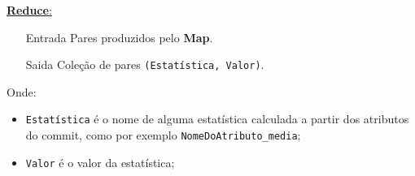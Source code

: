 \documentclass[brazil]{beamer}
\begin{document}
\begin{frame}[fragile]
  \underline{\Large \textbf{Reduce}:}
  
  \vspace{4pt}
  \begin{itemize}
    \item[Entrada] Pares produzidos pelo \textbf{Map}.
    \item[Saida] Coleção de pares \verb$(Estatística, Valor)$.
  \end{itemize}
  
  \pause
  \hspace{10pt}
  Onde:
  \begin{itemize}
    \item \verb$Estatística$ é o nome de alguma estatística calculada a partir dos atributos do commit, 
          como por exemplo \verb$NomeDoAtributo_media$;
    \item \verb$Valor$ é o valor da estatística;
  \end{itemize}
\end{frame}
\end{document}
